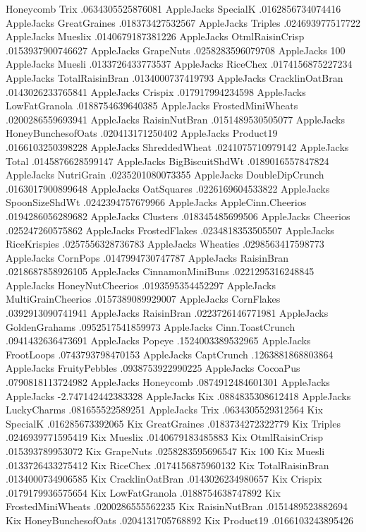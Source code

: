 Honeycomb	Trix	.0634305525876081
AppleJacks	SpecialK	.0162856734074416
AppleJacks	GreatGraines	.018373427532567
AppleJacks	Triples	.024693977517722
AppleJacks	Mueslix	.0140679187381226
AppleJacks	OtmlRaisinCrisp	.0153937900746627
AppleJacks	GrapeNuts	.0258283596079708
AppleJacks	100%
AppleJacks	Muesli	.0133726433773537
AppleJacks	RiceChex	.0174156875227234
AppleJacks	TotalRaisinBran	.0134000737419793
AppleJacks	CracklinOatBran	.0143026233765841
AppleJacks	Crispix	.017917994234598
AppleJacks	LowFatGranola	.0188754639640385
AppleJacks	FrostedMiniWheats	.0200286559693941
AppleJacks	RaisinNutBran	.0151489530505077
AppleJacks	HoneyBunchesofOats	.020413171250402
AppleJacks	Product19	.0166103250398228
AppleJacks	ShreddedWheat	.0241075710979142
AppleJacks	Total	.0145876628599147
AppleJacks	BigBiscuitShdWt	.0189016557847824
AppleJacks	NutriGrain	.0235201080073355
AppleJacks	DoubleDipCrunch	.0163017900899648
AppleJacks	OatSquares	.0226169604533822
AppleJacks	SpoonSizeShdWt	.0242394757679966
AppleJacks	AppleCinn.Cheerios	.0194286056289682
AppleJacks	Clusters	.018345485699506
AppleJacks	Cheerios	.025247260575862
AppleJacks	FrostedFlakes	.0234818353505507
AppleJacks	RiceKrispies	.0257556328736783
AppleJacks	Wheaties	.0298563417598773
AppleJacks	CornPops	.0147994730747787
AppleJacks	RaisinBran	.0218687858926105
AppleJacks	CinnamonMiniBuns	.0221295316248845
AppleJacks	HoneyNutCheerios	.0193595354452297
AppleJacks	MultiGrainCheerios	.0157389089929007
AppleJacks	CornFlakes	.0392913090741941
AppleJacks	RaisinBran	.0223726146771981
AppleJacks	GoldenGrahams	.0952517541859973
AppleJacks	Cinn.ToastCrunch	.0941432636473691
AppleJacks	Popeye	.1524003389532965
AppleJacks	FrootLoops	.0743793798470153
AppleJacks	CaptCrunch	.1263881868803864
AppleJacks	FruityPebbles	.0938753922990225
AppleJacks	CocoaPus	.0790818113724982
AppleJacks	Honeycomb	.0874912484601301
AppleJacks	AppleJacks	-2.747142442383328
AppleJacks	Kix	.0884835308612418
AppleJacks	LuckyCharms	.081655522589251
AppleJacks	Trix	.0634305529312564
Kix	SpecialK	.016285673392065
Kix	GreatGraines	.0183734272322779
Kix	Triples	.0246939771595419
Kix	Mueslix	.0140679183485883
Kix	OtmlRaisinCrisp	.015393789953072
Kix	GrapeNuts	.0258283595696547
Kix	100%
Kix	Muesli	.0133726433275412
Kix	RiceChex	.0174156875960132
Kix	TotalRaisinBran	.0134000734906585
Kix	CracklinOatBran	.0143026234980657
Kix	Crispix	.0179179936575654
Kix	LowFatGranola	.0188754638747892
Kix	FrostedMiniWheats	.0200286555562235
Kix	RaisinNutBran	.0151489523882694
Kix	HoneyBunchesofOats	.0204131705768892
Kix	Product19	.0166103243895426
